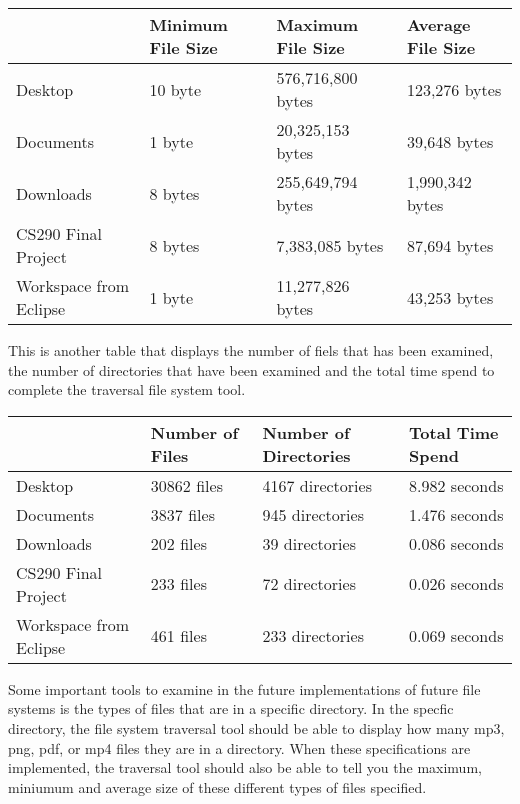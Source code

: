 \documentclass{article}
\begin{document}
\begin{center}
    \begin{tabular}{| l | l | l | l |}
    \hline
     & Minimum File Size & Maximum File Size & Average File Size \\ \hline
    Desktop & 10 byte & 576,716,800 bytes & 123,276 bytes  \\ \hline
    Documents & 1 byte & 20,325,153 bytes & 39,648 bytes \\ \hline
    Downloads & 8 bytes & 255,649,794 bytes & 1,990,342 bytes  \\ \hline
    CS290 Final Project & 8 bytes & 7,383,085 bytes & 87,694 bytes\\ \hline
    Workspace from Eclipse & 1 byte & 11,277,826 bytes & 43,253 bytes \\ \hline
    

    \end{tabular}

\end{center}
 
This is another table that displays the number of fiels that has been examined, the number of directories that have been examined and the total time spend to complete the traversal file system tool.

\begin{center}
    \begin{tabular}{| l | l | l | l |}
    \hline
     & Number of Files & Number of Directories & Total Time Spend \\ \hline
    Desktop & 30862 files & 4167 directories & 8.982 seconds \\ \hline
    Documents & 3837 files & 945 directories & 1.476 seconds  \\ \hline
    Downloads & 202 files & 39 directories & 0.086 seconds  \\ \hline
    CS290 Final Project & 233 files & 72 directories & 0.026 seconds \\ \hline
    Workspace from Eclipse & 461 files & 233 directories & 0.069 seconds   \\ \hline
    

    \end{tabular}

\end{center}


Some important tools to examine in the future implementations of future file systems is the types of files that are in a specific directory. In the specfic directory, the file system traversal tool should be able to display how many mp3, png, pdf, or mp4 files they are in a directory. When these specifications are implemented, the traversal tool should also be able to tell you the maximum, miniumum and average size of these different types of files specified.
\\
\end{document}
